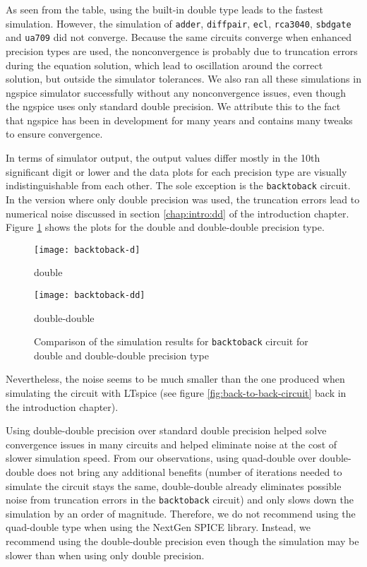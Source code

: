 
\vspace{-1cm}

As seen from the table, using the built-in double type leads to the fastest simulation. However, the simulation of \texttt{adder}, \texttt{diffpair}, \texttt{ecl}, \texttt{rca3040}, \texttt{sbdgate} and \texttt{ua709} did not converge. Because the same circuits converge when enhanced precision types are used, the nonconvergence is probably due to truncation errors during the equation solution, which lead to oscillation around the correct solution, but outside the simulator tolerances. We also ran all these simulations in ngspice simulator successfully without any nonconvergence issues, even though the ngspice uses only standard double precision. We attribute this to the fact that ngspice has been in development for many years and contains many tweaks to ensure convergence.

In terms of simulator output, the output values differ mostly in the 10th significant digit or lower and the data plots for each precision type are visually indistinguishable from each other. The sole exception is the \texttt{backtoback} circuit. In the version where only double precision was used, the truncation errors lead to numerical noise discussed in section \ref{chap:intro:dd} of the introduction chapter. Figure \ref{fig:results:noise} shows the plots for the double and double-double precision type.

\begin{figure}[h]
	\centering
		\texttt{[image: backtoback-d]}
		\caption*{double}
		\texttt{[image: backtoback-dd]}
		\caption*{double-double}
	\caption{Comparison of the simulation results for \texttt{backtoback} circuit for double and double-double precision type}
	\label{fig:results:noise}
\end{figure}

Nevertheless, the noise seems to be much smaller than the one produced when simulating the circuit with LTspice (see figure \ref{fig:back-to-back-circuit} back in the introduction chapter).

Using double-double precision over standard double precision helped solve convergence issues in many circuits and helped eliminate noise at the cost of slower simulation speed. From our observations, using quad-double over double-double does not bring any additional benefits (number of iterations needed to simulate the circuit stays the same, double-double already eliminates possible noise from truncation errors in the \texttt{backtoback} circuit) and only slows down the simulation by an order of magnitude. Therefore, we do not recommend using the quad-double type when using the NextGen SPICE library. Instead, we recommend using the double-double precision even though the simulation may be slower than when using only double precision.

